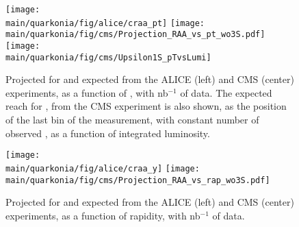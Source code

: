 \documentclass[../report.tex]{subfiles}
\providecommand{\main}{..}
\begin{document}
\begin{figure}
\begin{center}
 \texttt{[image: \\main/quarkonia/fig/alice/craa\_pt]}
 \texttt{[image: \\main/quarkonia/fig/cms/Projection\_RAA\_vs\_pt\_wo3S.pdf]}
 \texttt{[image: \\main/quarkonia/fig/cms/Upsilon1S\_pTvsLumi]}
\end{center}

 \caption{Projected \raa for  and  expected from the ALICE (left) and CMS (center) experiments, as a function of \pt, with \unit[10]{nb}$^{-1}$ of \PbPb data. The expected \pt reach for , from the CMS experiment is
 also shown, as the position of the last \pt bin of the measurement, with constant number of observed , as a function of integrated luminosity.
 }
 \label{fig:upsi_raa_pt}
\end{figure}

\begin{figure}
\begin{center}
 \texttt{[image: \\main/quarkonia/fig/alice/craa\_y]}
 \texttt{[image: \\main/quarkonia/fig/cms/Projection\_RAA\_vs\_rap\_wo3S.pdf]}
\end{center}

 \caption{Projected \raa for  and  expected from the ALICE (left) and CMS (center) experiments, as a function of rapidity, with \unit[10]{nb}$^{-1}$ of \PbPb data.
 }
 \label{fig:upsi_raa_y}
\end{figure}
\end{document}
